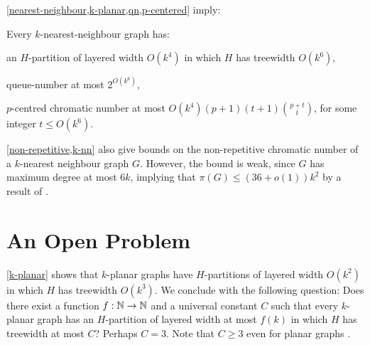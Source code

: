 \documentclass{patmorin}
\renewcommand{\geq}{\geqslant}
\renewcommand{\leq}{\leqslant}
\begin{document}
\cref{nearest-neighbour,k-planar,qn,p-centered} imply:

\begin{cor}
\label{k-nn}
Every $k$-nearest-neighbour graph has:
\begin{compactitem}
\item an $H$-partition of layered width $O(k^4)$ in which $H$ has treewidth $O(k^6)$,
\item queue-number at most $2^{O(k^6)}$,
\item $p$-centred chromatic number at most $O(k^4) (p+1) (t+1)\binom{p+t}{t}$, for some integer $t\leq O(k^6)$.
\end{compactitem}
\end{cor}

\cref{non-repetitive,k-nn} also give bounds on the non-repetitive chromatic number of a $k$-nearest neighbour graph $G$. However, the bound is weak, since $G$ has maximum degree at most $6k$, implying that $\pi(G) \leq (36+o(1))k^2$ by a result of \citet{DJKW16}.


\section{An Open Problem}

\cref{k-planar} shows that $k$-planar graphs have $H$-partitions of layered width $O(k^2)$ in which $H$ has treewidth $O(k^3)$.  We conclude with the following question:  Does there exist a function $f:\mathbb{N}\to\mathbb{N}$ and a universal constant $C$ such that every $k$-planar graph has an $H$-partition of layered width at most $f(k)$ in which $H$ has treewidth at most $C$?  Perhaps $C=3$. Note that $C\geq 3$ even for planar graphs \citep{dujmovic.joret.ea:planar}.  



\end{document}
